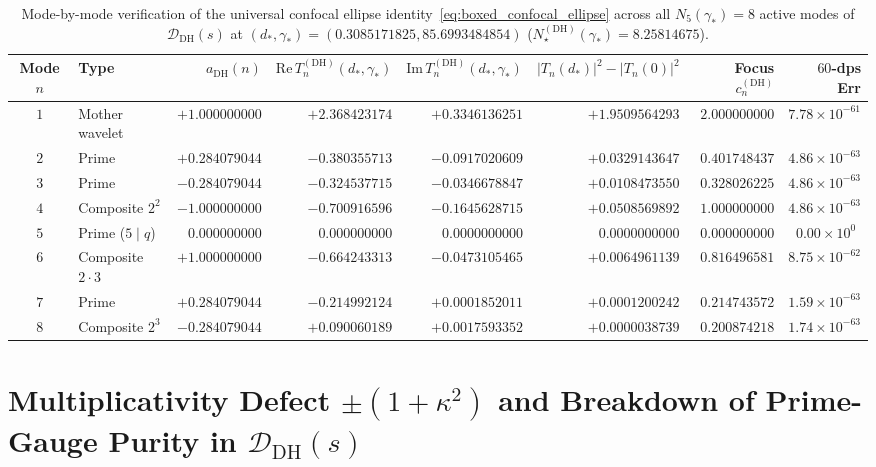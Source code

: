 \documentclass[11pt,reqno]{amsart}
\theoremstyle{definition}
\theoremstyle{remark}
\numberwithin{equation}{section}
\newcommand{\Rea}{\mathrm{Re}}
\newcommand{\Ima}{\mathrm{Im}}
\newcommand{\DHf}{\mathrm{DH}}
\begin{document}
\begin{table}[t]
\centering
\caption{Mode-by-mode verification of the universal confocal ellipse identity~\eqref{eq:boxed_confocal_ellipse} across all $N_5(\gamma_*) = 8$ active modes of $\mathcal{D}_{\DHf}(s)$ at $(d_*, \gamma_*) = (0.3085171825, 85.6993484854)$ ($N_\star^{(\DHf)}(\gamma_*) = 8.25814675$).}\label{tab:confocal_modes_dh}
\scriptsize
\setlength{\tabcolsep}{2.4pt}
\begin{tabular}{@{}clrrrrrr@{}}
\toprule
Mode $n$ & Type & $a_{\DHf}(n)$ & $\Rea\,T_n^{(\DHf)}(d_*,\gamma_*)$ & $\Ima\,T_n^{(\DHf)}(d_*,\gamma_*)$ & $|T_n(d_*)|^2 - |T_n(0)|^2$ & Focus $c_n^{(\DHf)}$ & $60$-dps Err \\
\midrule
$1$ & Mother wavelet & $+1.000000000$ & $+2.368423174$ & $+0.3346136251$ & $+1.9509564293$ & $2.000000000$ & $7.78 \times 10^{-61}$ \\
$2$ & Prime & $+0.284079044$ & $-0.380355713$ & $-0.0917020609$ & $+0.0329143647$ & $0.401748437$ & $4.86 \times 10^{-63}$ \\
$3$ & Prime & $-0.284079044$ & $-0.324537715$ & $-0.0346678847$ & $+0.0108473550$ & $0.328026225$ & $4.86 \times 10^{-63}$ \\
$4$ & Composite $2^2$ & $-1.000000000$ & $-0.700916596$ & $-0.1645628715$ & $+0.0508569892$ & $1.000000000$ & $4.86 \times 10^{-63}$ \\
$5$ & Prime ($5 \mid q$) & $0.000000000$ & $0.000000000$ & $0.0000000000$ & $0.0000000000$ & $0.000000000$ & $0.00 \times 10^{0\phantom{0}}$ \\
$6$ & Composite $2\cdot 3$ & $+1.000000000$ & $-0.664243313$ & $-0.0473105465$ & $+0.0064961139$ & $0.816496581$ & $8.75 \times 10^{-62}$ \\
$7$ & Prime & $+0.284079044$ & $-0.214992124$ & $+0.0001852011$ & $+0.0001200242$ & $0.214743572$ & $1.59 \times 10^{-63}$ \\
$8$ & Composite $2^3$ & $-0.284079044$ & $+0.090060189$ & $+0.0017593352$ & $+0.0000038739$ & $0.200874218$ & $1.74 \times 10^{-63}$ \\
\bottomrule
\end{tabular}
\end{table}

\section{Multiplicativity Defect \texorpdfstring{$\pm(1+\kappa^2)$}{+-(1+kappa^2)} and Breakdown of Prime-Gauge Purity in \texorpdfstring{$\mathcal{D}_{\DHf}(s)$}{D\_DH(s)}}\label{sec:prime_gauge_breakdown}
\end{document}
